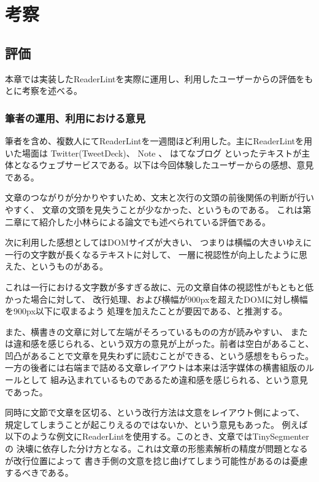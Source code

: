 \chapter{考察}

\section{評価}

本章では実装したReaderLintを実際に運用し、利用したユーザーからの評価をもとに考察を述べる。


\subsection{筆者の運用、利用における意見}
筆者を含め、複数人にてReaderLintを一週間ほど利用した。主にReaderLintを用いた場面は
Twitter(TweetDeck)\footnotemark[1]\label{twitter}、
Note \footnotemark[2]\label{note}、
はてなブログ \footnotemark[3]\label{hatenablog} 
といったテキストが主体となるウェブサービスである。以下は今回体験したユーザーからの感想、意見である。





文章のつながりが分かりやすいため、文末と次行の文頭の前後関係の判断が行いやすく、
文章の文頭を見失うことが少なかった、というものである。
これは第二章にて紹介した小林らによる論文でも述べられている評価である。

次に利用した感想としてはDOMサイズが大きい、
つまりは横幅の大きいゆえに一行の文字数が長くなるテキストに対して、
一層に視認性が向上したように思えた、というものがある。

これは一行における文字数が多すぎる故に、元の文章自体の視認性がもともと低かった場合に対して、
改行処理、および横幅が900pxを超えたDOMに対し横幅を900px以下に収まるよう
処理を加えたことが要因である、と推測する。

また、横書きの文章に対して左端がそろっているものの方が読みやすい、
または違和感を感じられる、という双方の意見が上がった。前者は空白があること、
凹凸があることで文章を見失わずに読むことができる、という感想をもらった。
一方の後者には右端まで詰める文章レイアウトは本来は活字媒体の横書組版のルールとして
組み込まれているものであるため違和感を感じられる、という意見であった。

同時に文節で文章を区切る、という改行方法は文意をレイアウト側によって、
規定してしまうことが起こりえるのではないか、という意見もあった。
例えば以下のような例文にReaderLintを使用する。このとき、文章ではTinySegmenterの
決壊に依存した分け方となる。これは文章の形態素解析の精度が問題となるが改行位置によって
書き手側の文意を捻じ曲げてしまう可能性があるのは憂慮するべきである。

